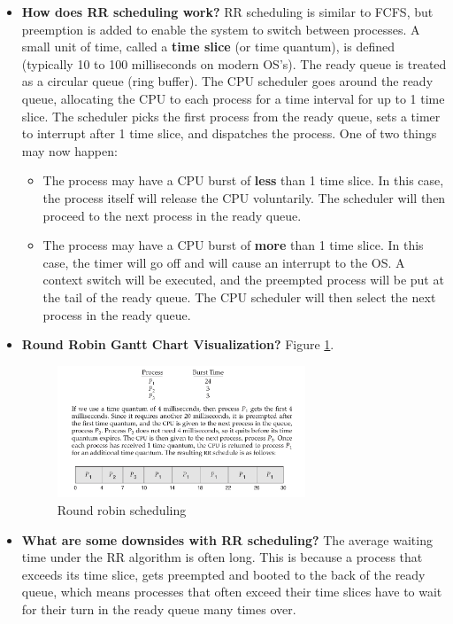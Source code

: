 \documentclass[12pt]{article}
\begin{document}
\begin{itemize}
    \item \textbf{How does RR scheduling work?} RR scheduling is similar to FCFS, but preemption is added to enable the system to switch between processes. A small unit of time, called a \textbf{time slice} (or time quantum), is defined (typically 10 to 100 milliseconds on modern OS's). The ready queue is treated as a circular queue (ring buffer). The CPU scheduler goes around the ready queue, allocating the CPU to each process for a time interval for up to 1 time slice. The scheduler picks the first process from the ready queue, sets a timer to interrupt after 1 time slice, and dispatches the process. One of two things may now happen:
        \begin{itemize}
            \item The process may have a CPU burst of \textbf{less} than 1 time slice. In this case, the process itself will release the CPU voluntarily. The scheduler will then proceed to the next process in the ready queue.
            \item The process may have a CPU burst of \textbf{more} than 1 time slice. In this case, the timer will go off and will cause an interrupt to the OS. A context switch will be executed, and the preempted process will be put at the tail of the ready queue. The CPU scheduler will then select the next process in the ready queue.
        \end{itemize}
    \item \textbf{Round Robin Gantt Chart Visualization?} Figure \ref{fig:rr-scheduling}.
        \begin{figure}[ht]
            \centering
            \includegraphics[width=0.7\textwidth]{figures/rr-scheduling.jpg}
            \caption{Round robin scheduling}
            \label{fig:rr-scheduling}
        \end{figure}
    \item \textbf{What are some downsides with RR scheduling?} The average waiting time under the RR algorithm is often long. This is because a process that exceeds its time slice, gets preempted and booted to the back of the ready queue, which means processes that often exceed their time slices have to wait for their turn in the ready queue many times over.

\end{itemize}
\end{document}

